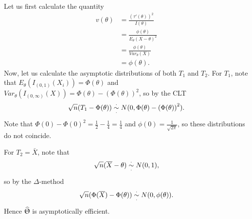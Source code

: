 \documentclass{stat_homework}
\begin{document}
\begin{solution}
  Let us first calculate the quantity
  \begin{align*}
    v(\theta) &= \frac{ (\tau'(\theta))^2 }{ I(\theta) }\\
    &= \frac{ \phi(\theta) }{ E_\theta (X-\theta)^2 } \\
    &= \frac{ \phi(\theta) }{ Var_\theta (X) }\\
    &= \phi(\theta). 
  \end{align*}
  Now, let us calculate the asymptotic distributions of both $T_1$ and $T_2$.  For $T_1$, note that $E_\theta (I_{(0,1)}(X_i)) = \Phi(\theta)$ and $Var_\theta(I_{(0,\infty)}(X)) = \Phi (\theta) - \left(\Phi(\theta)\right)^2$, so by the CLT
  $$
  \sqrt n (T_1 - \Phi(\theta))\overset{\cdotp}{\underset{\cdotp}{\sim}} N(0,\Phi (\theta) - \left(\Phi(\theta)\right)^2).
  $$
  Note that $\Phi(0) - \Phi(0)^2 = \frac 12 - \frac 14 = \frac 14$ and $\phi(0) = \frac{1}{\sqrt{2\pi}}$, so these distributions do not coincide. 

  For $T_2 = \bar X$, note that 
  $$
    \sqrt n (\overline X - \theta) \overset{\cdotp}{\underset{\cdotp}{\sim}} N(0,1),
  $$
  so by the $\Delta$-method 
  $$
    \sqrt n (\Phi(\overline X) - \Phi(\theta)) \overset{\cdotp}{\underset{\cdotp}{\sim}} N(0, \phi(\theta)).
  $$
  Hence $\widehat \Uptheta$ is asymptotically efficient.
\end{solution}

\newpage
\end{document}

